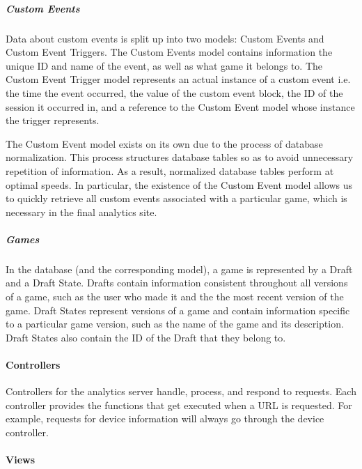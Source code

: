 \subparagraph{Custom Events}
	Data about custom events is split up into two models: Custom Events and Custom Event Triggers. The Custom Events model contains information the unique ID and name of the event, as well as what game it belongs to.
	The Custom Event Trigger model represents an actual instance of a custom event i.e. the time the event occurred, the value of the custom event block, the ID of the session it occurred in, and a reference to the Custom Event model whose instance the trigger represents.

	The Custom Event model exists on its own due to the process of database normalization. This process structures database tables so as to avoid unnecessary repetition of information. As a result, normalized database tables perform at optimal speeds. In particular, the existence of the Custom Event model allows us to quickly retrieve all custom events associated with a particular game, which is necessary in the final analytics site.

\subparagraph{Games}
	In the database (and the corresponding model), a game is represented by a Draft and a Draft State. Drafts contain information consistent throughout all versions of a game, such as the user who made it and the the most recent version of the game. Draft States represent versions of a game and contain information specific to a particular game version, such as the name of the game and its description. Draft States also contain the ID of the Draft that they belong to.

\paragraph{Controllers} 

Controllers for the analytics server handle, process, and respond to requests. Each controller provides the functions that get executed when a URL is requested. For example, requests for device information will always go through the device controller. 


\paragraph{Views}











